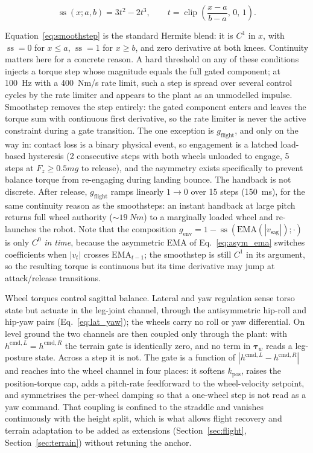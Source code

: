 \documentclass[a4paper,fleqn]{cas-dc}
\begin{document}
\begin{equation}
\operatorname{ss}(x;a,b) = 3t^2 - 2t^3,
\qquad t = \operatorname{clip}\!\left(\frac{x-a}{b-a},\,0,\,1\right).
\label{eq:smoothstep}
\end{equation}

Equation~\eqref{eq:smoothstep} is the standard Hermite blend: it is $C^1$ in $x$, with $\operatorname{ss}=0$ for $x\leq a$, $\operatorname{ss}=1$ for $x\geq b$, and zero derivative at both knees.
Continuity matters here for a concrete reason. A hard threshold on any of these conditions injects a torque step whose magnitude equals the full gated component; at \SI{100}{Hz} with a \SI{400}{Nm/s} rate limit, such a step is spread over several control cycles by the rate limiter and appears to the plant as an unmodelled impulse.
Smoothstep removes the step entirely: the gated component enters and leaves the torque sum with continuous first derivative, so the rate limiter is never the active constraint during a gate transition.
The one exception is $g_{\text{flight}}$, and only on the way in: contact loss is a binary physical event, so engagement is a latched load-based hysteresis (\num{2} consecutive steps with both wheels unloaded to engage, \num{5} steps at $F_z \geq 0.5mg$ to release), and the asymmetry exists specifically to prevent balance torque from re-engaging during landing bounce.
The handback is not discrete. After release, $g_{\text{flight}}$ ramps linearly $1\to0$ over \num{15} steps (\SI{150}{ms}), for the same continuity reason as the smoothsteps: an instant handback at large pitch returns full wheel authority (${\sim}\SI{19}{Nm}$) to a marginally loaded wheel and re-launches the robot.
Note that the composition $g_{\text{env}} = 1 - \operatorname{ss}(\mathrm{EMA}(|v_{\text{sag}}|);\cdot)$ is only $C^0$ \emph{in time}, because the asymmetric EMA of Eq.~\eqref{eq:asym_ema} switches coefficients when $|v_t|$ crosses $\mathrm{EMA}_{t-1}$; the smoothstep is still $C^1$ in its argument, so the resulting torque is continuous but its time derivative may jump at attack/release transitions.

Wheel torques control sagittal balance. Lateral and yaw regulation sense torso state but actuate in the leg-joint channel, through the antisymmetric hip-roll and hip-yaw pairs (Eq.~\eqref{eq:lat_yaw}); the wheels carry no roll or yaw differential.
On level ground the two channels are then coupled only through the plant: with $h^{\text{cmd},L}{=}h^{\text{cmd},R}$ the terrain gate is identically zero, and no term in $\boldsymbol{\tau}_w$ reads a leg-posture state.
Across a step it is not. The gate is a function of $|h^{\text{cmd},L}-h^{\text{cmd},R}|$ and reaches into the wheel channel in four places: it softens $k_{\text{pos}}$, raises the position-torque cap, adds a pitch-rate feedforward to the wheel-velocity setpoint, and symmetrises the per-wheel damping so that a one-wheel step is not read as a yaw command.
That coupling is confined to the straddle and vanishes continuously with the height split, which is what allows flight recovery and terrain adaptation to be added as extensions (Section~\ref{sec:flight}, Section~\ref{sec:terrain}) without retuning the anchor.
\end{document}
